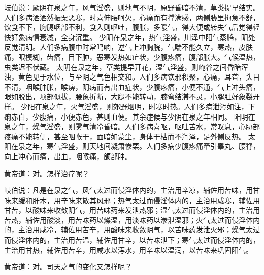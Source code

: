 \documentclass[12pt,UTF8]{ctexbook}
\begin{document}
岐伯说：厥阴在泉之年，风气淫盛，则地气不明，原野昏暗不清，草类提早结实。人们多病洒洒然振栗恶寒，时喜伸腰呵欠，心痛而有撑满感，两侧胁里拘急不舒，饮食不下，胸膈咽部不利，食入则呕吐，腹胀，多暖气，得大便或转失气后觉得轻快好象病情衰减，全身沉重。
少阴在泉之年，热气淫盛，川泽中阳气蒸腾，阴处反觉清明。人们多病腹中时常鸣响，逆气上冲胸脘，气喘不能久立，寒热，皮肤痛，眼模糊，齿痛，目下肿，恶寒发热如疟状，少腹疼痛，腹部胀大。气候温热，虫类迟不伏藏。
太阴在泉之年，草类提早开花，湿气淫盛，则崦谷之间昏暗浑浊，黄色见于水位，与至阴之气色相交和。人们多病饮邪积聚，心痛，耳聋，头目不清，咽喉肿胀，喉痹，阴病而有出血症状，少腹疼痛，小便不通，气上冲头痛，眼如脱出，项部似拔，腰象折断，大腿不能转动，膝弯结滞不灵，小腿肚好象裂开样。
少阳在泉之年，火气淫盛，则郊野烟明，时寒时热。人们多病泄泻如注，下痢赤白，少腹痛，小便赤色，甚则血便。其余症候与少阴在泉之年相同。
阳明在泉之年，燥气淫盛，则雾气清冷昏暗。人们多病喜呕，呕吐苦水，常叹息，心胁部疼痛不能转侧，甚至咽喉干，面暗如蒙尘，身体干枯而不润泽，足外侧反热。
太阳在泉之年，寒气淫盛，则天地间凝肃惨栗。人们多病少腹疼痛牵引睾丸、腰脊，向上冲心而痛，出血，咽喉痛，颌部肿。

黄帝道：对。怎样治疗呢？

岐伯说：凡是在泉之气，风气太过而侵淫体内的，主治用辛凉，辅佐用苦味，用甘味来缓和肝木，用辛味来散其风邪；热气太过而侵淫体内的，主治用咸寒，辅佐用甘苦，以酸味来收敛阴气，用苦味药来发泄热邪；湿气太过而侵淫体内的，主治用苦热，辅佐用酸淡，用苦味药以燥湿，用淡味药以渗泄湿邪；火气太过而侵淫体内的，主治用咸冷，辅佐用苦辛，用酸味来收敛阴气，以苦味药发泄火邪；燥气太过而侵淫体内的，主治用苦温，辅佐用甘辛，以苦味泄下；寒气太过而侵淫体内的，主治用甘热，辅佐用苦辛，用咸水以泻水，用辛味以温润，以苦味来巩固阳气。

黄帝道：对。司天之气的变化又怎样呢？
\end{document}

